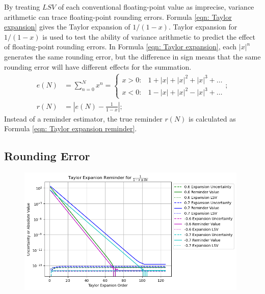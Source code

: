 \documentclass[twoside]{article}
\numberwithin{equation}{section}
\begin{document}
By treating $LSV$ of each conventional floating-point value as imprecise, variance arithmetic can trace floating-point rounding errors.
Formula \eqref{eqn: Taylor expansion} gives the Taylor expansion of $1/(1 - x)$.
Taylor expansion for $1/(1-x)$ is used to test the ability of variance arithmetic to predict the effect of floating-point rounding errors.
In Formula \eqref{eqn: Taylor expansion}, each $|x|^n$ generates the same rounding error, but the difference in sign means that the same rounding error will have different effects for the summation. 
\begin{align}
\label{eqn: Taylor expansion}
e(N) &= \sum_{n = 0}^{N} x^n = \begin{cases} 
x > 0: &1 + |x| + |x|^2 + |x|^3 + \dots \\
x < 0: & 1 - |x| + |x|^2 - |x|^3 + \dots
\end{cases}; \\
\label{eqn: Taylor expansion reminder}
r(N) & = \left| e(N) - \frac{1}{1-x} \right|;
\end{align}
Instead of a reminder estimator, the true reminder $r(N)$ is calculated as Formula \eqref{eqn: Taylor expansion reminder}.



\subsection{Rounding Error}

\begin{figure}[p]
\centering
\includegraphics[height=2.4in]{Taylor_Expansion_Uncertainty.png} 
\label{fig: Taylor_Expansion_Uncertainty}
\end{figure}
\end{document}
